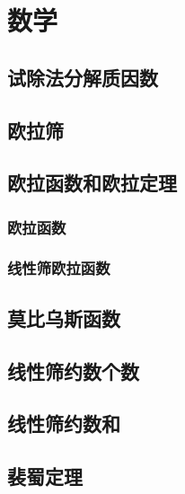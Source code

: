\documentclass[10pt,a4paper]{article}
\begin{document}
\section{数学}
\subsection{试除法分解质因数}

\subsection{欧拉筛}

\subsection{欧拉函数和欧拉定理}
\subsubsection{欧拉函数}
\begin{spacing}{1.5}

\end{spacing}

\subsubsection{线性筛欧拉函数}

\subsection{莫比乌斯函数}
\begin{spacing}{1.5}

\end{spacing}

\subsection{线性筛约数个数}
\begin{spacing}{1.5}

\end{spacing}

\subsection{线性筛约数和}
\begin{spacing}{1.5}

\end{spacing}

\subsection{裴蜀定理}
\begin{spacing}{1.5}

\end{spacing}
\end{document}
